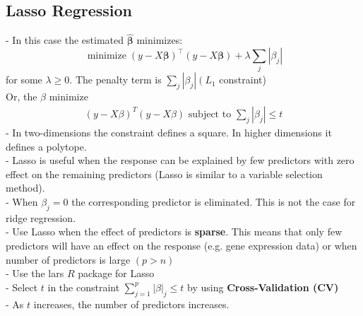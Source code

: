\documentclass[11pt,a4paper]{article}
\begin{document}
\subsection{Lasso Regression}
- In this case the estimated $\hat{\boldsymbol{\beta}}$ minimizes:
$$
\operatorname{minimize}(y-X \boldsymbol{\beta})^{\top}(y-X \boldsymbol{\beta})+\lambda \sum_{j}\left|\beta_{j}\right|
$$
for some $\lambda \geq 0$. The penalty term is $\sum_{j}\left|\beta_{j}\right|\left(L_{1}\right.$ constraint)\\
Or, the $\beta$ minimize
\begin{equation}
    \begin{aligned}
        (y-X\beta)^T(y-X\beta)\text{ subject to }\sum_{j}\left|\beta_{j}\right|\leq t
    \end{aligned}
    \nonumber
\end{equation}
- In two-dimensions the constraint defines a square. In higher dimensions it defines a polytope.\\
- Lasso is useful when the response can be explained by few predictors with zero effect on the remaining predictors (Lasso is similar to a variable selection method).\\
- When $\beta_{j}=0$ the corresponding predictor is eliminated. This is not the case for ridge regression.\\

- Use Lasso when the effect of predictors is \textbf{sparse}. This means that only few predictors will have an effect on the response (e.g. gene expression data) or when number of predictors is large $(p>n)$\\
- Use the lars $R$ package for Lasso\\
- Select $t$ in the constraint $\sum_{j=1}^{p}|\beta|_{j} \leq t$ by using \textbf{Cross-Validation (CV)}\\
- As $t$ increases, the number of predictors increases.
\end{document}
